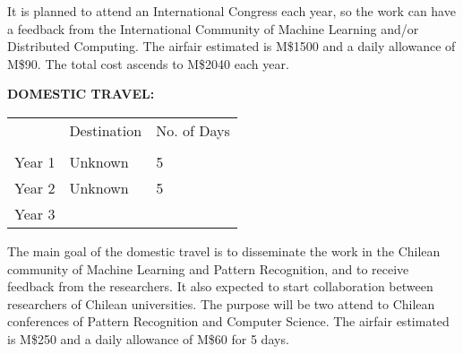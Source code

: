 \documentclass[10pt]{article}
\begin{document}
\vspace{15pt}

\begin{comment}
En este proyecto se planifica asistir a Congresos Internacionales cada año, para así recibir retroalimentación de la Comunidad Internacional de Machine Learning, Descubrimiento de Conocimiento desde Grandes Bases de Datos y Computación Distribuida. El costo estimado de vuelo es de M\$1500 y el viatico diario es de M\$90. El costo total por año asciende a M\$2040.
\end{comment}

It is planned to attend an International Congress each year, so the work can have a feedback from the International Community of Machine Learning and/or Distributed Computing. The airfair estimated is M\$1500 and a daily allowance of M\$90. The total cost ascends to M\$2040 each year.


\vspace{15pt}

\textbf{\uppercase{DOMESTIC TRAVEL: }}
\vspace{15pt}

\begin{tabular}{l|l|l|}
\cline{2-3}
                             & Destination & No. of Days \\ \cline{2-3} 
                             &             &             \\ \hline
\multicolumn{1}{|l|}{Year 1} &   Unknown          &     5        \\ \hline
\multicolumn{1}{|l|}{Year 2} &      Unknown       &     5        \\ \hline
\multicolumn{1}{|l|}{Year 3} &          &           \\ \hline
\end{tabular}
\vspace{15pt}

The main goal of the domestic travel is to disseminate the work in the Chilean community of Machine Learning and Pattern Recognition, and to receive feedback from the researchers. It also expected to start collaboration between researchers of Chilean universities. The purpose will be two attend to Chilean conferences of Pattern Recognition and Computer Science. The airfair estimated is M\$250 and a daily allowance of M\$60 for 5 days.
\end{document}
